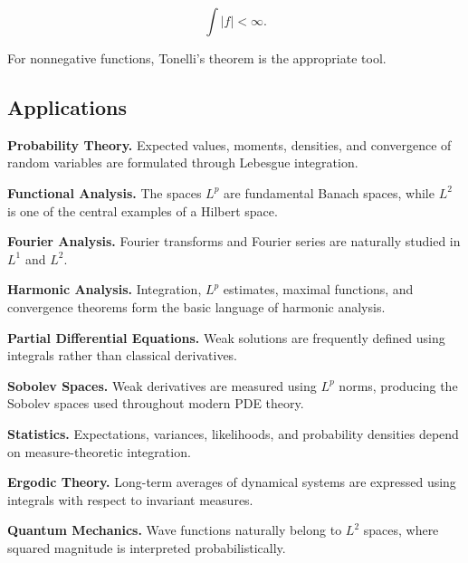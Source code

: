 \[
\boxed{
\int|f|<\infty.
}
\]

For nonnegative functions, Tonelli's theorem is the appropriate tool.

\subsection{Applications}
\label{subsec:lebesgue-integration-applications}

\begin{applicationbox}
\textbf{Probability Theory.}
Expected values, moments, densities, and convergence of random variables
are formulated through Lebesgue integration.

\medskip

\textbf{Functional Analysis.}
The spaces \(L^p\) are fundamental Banach spaces, while \(L^2\) is one of
the central examples of a Hilbert space.

\medskip

\textbf{Fourier Analysis.}
Fourier transforms and Fourier series are naturally studied in \(L^1\)
and \(L^2\).

\medskip

\textbf{Harmonic Analysis.}
Integration, \(L^p\) estimates, maximal functions, and convergence
theorems form the basic language of harmonic analysis.

\medskip

\textbf{Partial Differential Equations.}
Weak solutions are frequently defined using integrals rather than
classical derivatives.

\medskip

\textbf{Sobolev Spaces.}
Weak derivatives are measured using \(L^p\) norms, producing the Sobolev
spaces used throughout modern PDE theory.

\medskip

\textbf{Statistics.}
Expectations, variances, likelihoods, and probability densities depend on
measure-theoretic integration.

\medskip

\textbf{Ergodic Theory.}
Long-term averages of dynamical systems are expressed using integrals with
respect to invariant measures.

\medskip

\textbf{Quantum Mechanics.}
Wave functions naturally belong to \(L^2\) spaces, where squared magnitude
is interpreted probabilistically.
\end{applicationbox}

